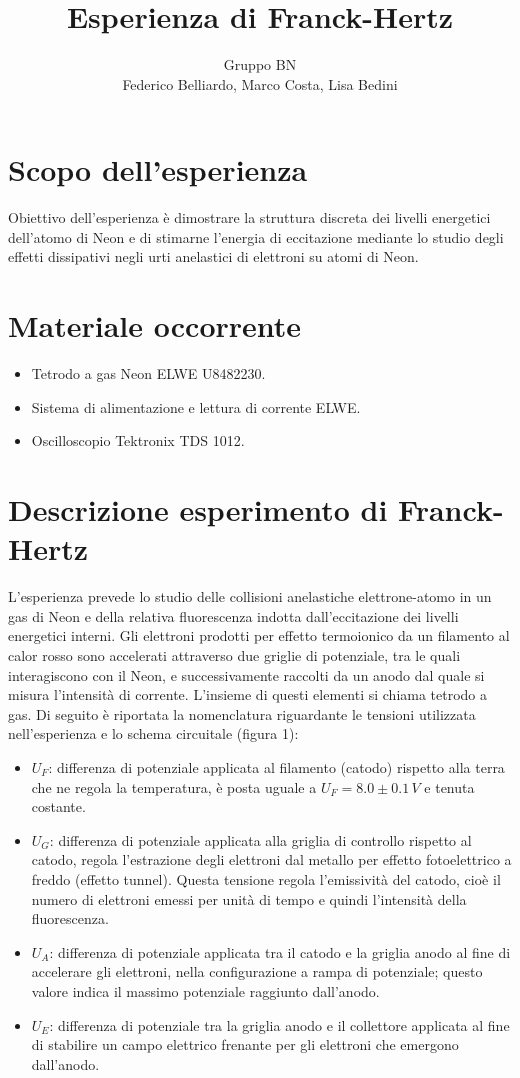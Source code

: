 \documentclass[10pt,a4paper]{article}
\author{Gruppo BN \\ Federico Belliardo, Marco Costa, Lisa Bedini}
\title{Esperienza di Franck-Hertz}
\begin{document}
\maketitle
\section{Scopo dell'esperienza}
Obiettivo dell'esperienza è dimostrare la struttura discreta dei livelli energetici dell'atomo di Neon e di stimarne l'energia di eccitazione mediante lo studio degli effetti dissipativi negli urti anelastici di elettroni su atomi di Neon.\\

\section{Materiale occorrente}
\begin{itemize}
\item Tetrodo a gas Neon ELWE U8482230.
\item Sistema di alimentazione e lettura di corrente ELWE.
\item Oscilloscopio Tektronix TDS 1012.
\end{itemize}

\section{Descrizione esperimento di Franck-Hertz}
L'esperienza prevede lo studio delle collisioni anelastiche elettrone-atomo in un gas di Neon e della relativa fluorescenza indotta dall'eccitazione dei livelli energetici interni. Gli elettroni prodotti per effetto termoionico da un filamento al calor rosso sono accelerati attraverso due griglie di potenziale, tra le quali interagiscono con il Neon, e successivamente raccolti da un anodo dal quale si misura l'intensità di corrente. L'insieme di questi elementi si chiama tetrodo a gas.
Di seguito è riportata la nomenclatura riguardante le tensioni utilizzata nell'esperienza e lo schema circuitale (figura 1):

\begin{itemize}
\item $U_F$: differenza di potenziale applicata al filamento (catodo) rispetto alla terra che ne regola la temperatura, è posta uguale a $U_F = 8.0\pm0.1 \,V$ e tenuta costante.
\item $U_G$: differenza di potenziale applicata alla griglia di controllo rispetto al catodo, regola l'estrazione degli elettroni dal metallo per effetto fotoelettrico a freddo (effetto tunnel). Questa tensione regola l'emissività del catodo, cioè il numero di elettroni emessi per unità di tempo e quindi l'intensità della fluorescenza.
\item $U_A$: differenza di potenziale applicata tra il catodo e la griglia anodo al fine di accelerare gli elettroni, nella configurazione a rampa di potenziale; questo valore indica il massimo potenziale raggiunto dall'anodo.
\item $U_E$: differenza di potenziale tra la griglia anodo e il collettore applicata al fine di stabilire un campo elettrico frenante per gli elettroni che emergono dall'anodo.
\end{itemize}
\end{document}
